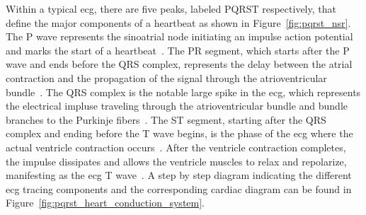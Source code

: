 \documentclass[\main/thesis.tex]{subfiles}
\begin{document}
Within a typical \gls{ecg}, there are five peaks, labeled PQRST respectively, that define the major components of a heartbeat as shown in Figure~\ref{fig:pqrst_nsr}.
The P wave represents the sinoatrial node initiating an impulse action potential and marks the start of a heartbeat~\cite{betts-anatomy-and-physiology}.
The PR segment, which starts after the P wave and ends before the QRS complex, represents the delay between the atrial contraction and the propagation of the signal through the atrioventricular bundle~\cite{betts-anatomy-and-physiology}.
The QRS complex is the notable large spike in the \gls{ecg}, which represents the electrical impluse traveling through the atrioventricular bundle and bundle branches to the Purkinje fibers~\cite{betts-anatomy-and-physiology}.
The ST segment, starting after the QRS complex and ending before the T wave begins, is the phase of the \gls{ecg} where the actual ventricle contraction occurs~\cite{betts-anatomy-and-physiology}.
After the ventricle contraction completes, the impulse dissipates and allows the ventricle muscles to relax and repolarize, manifesting as the \gls{ecg} T wave~\cite{betts-anatomy-and-physiology}.
A step by step diagram indicating the different \gls{ecg} tracing components and the corresponding cardiac diagram can be found in Figure~\ref{fig:pqrst_heart_conduction_system}.
\end{document}
